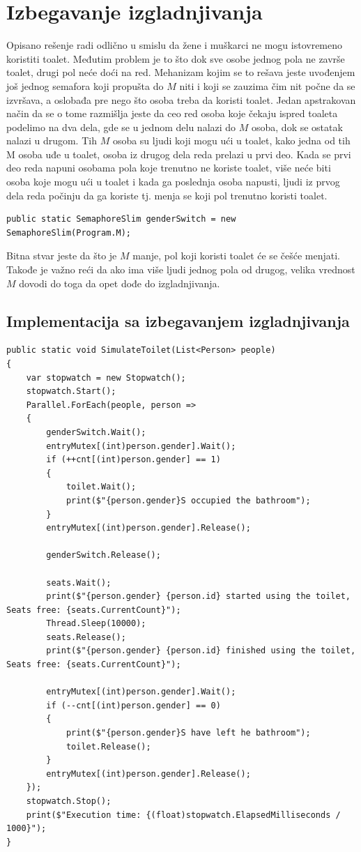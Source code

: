 \documentclass[11pt]{article}
\begin{document}
	\section{Izbegavanje izgladnjivanja}
	Opisano rešenje radi odlično u smislu da žene i muškarci ne mogu istovremeno
	koristiti toalet.
	Međutim problem je to što dok sve osobe jednog pola ne završe toalet,
	drugi pol neće doći na red.
	Mehanizam kojim se to rešava jeste uvođenjem još jednog semafora koji
	propušta do $M$ niti i koji se zauzima čim nit počne da se izvršava, a
	oslobađa pre nego što osoba treba da koristi toalet.
	Jedan apstrakovan način da se o tome razmišlja jeste da ceo red osoba
	koje čekaju ispred toaleta podelimo na dva dela, gde se u jednom delu
	nalazi do $M$ osoba, dok se ostatak nalazi u drugom.
	Tih $M$ osoba su ljudi koji mogu ući u toalet, kako jedna od tih M osoba
	uđe u toalet, osoba iz drugog dela reda prelazi u prvi deo.
	Kada se prvi deo reda napuni osobama pola koje trenutno ne koriste toalet,
	više neće biti osoba koje mogu ući u toalet i kada ga poslednja osoba
	napusti, ljudi iz prvog dela reda počinju da ga koriste tj. menja se koji
	pol trenutno koristi toalet.
	\vspace{0.5cm}
	\begin{lstlisting}[language={[Sharp]C}]
		public static SemaphoreSlim genderSwitch = new SemaphoreSlim(Program.M);
	\end{lstlisting}
	Bitna stvar jeste da što je $M$ manje, pol koji koristi toalet
	će se češće menjati.
	Takođe je važno reći da ako ima više ljudi jednog pola od drugog,
	velika vrednost $M$ dovodi do toga da opet dođe do izgladnjivanja.
	\subsection{Implementacija sa izbegavanjem izgladnjivanja}
	\begin{lstlisting}[language={[Sharp]C}]
public static void SimulateToilet(List<Person> people)
{
    var stopwatch = new Stopwatch();
    stopwatch.Start();
    Parallel.ForEach(people, person =>
    {
        genderSwitch.Wait();
        entryMutex[(int)person.gender].Wait();
        if (++cnt[(int)person.gender] == 1)
        {
            toilet.Wait();
            print($"{person.gender}S occupied the bathroom");
        }
        entryMutex[(int)person.gender].Release();

        genderSwitch.Release();

        seats.Wait();
        print($"{person.gender} {person.id} started using the toilet, Seats free: {seats.CurrentCount}");
        Thread.Sleep(10000);
        seats.Release();
        print($"{person.gender} {person.id} finished using the toilet, Seats free: {seats.CurrentCount}");

        entryMutex[(int)person.gender].Wait();
        if (--cnt[(int)person.gender] == 0)
        {
            print($"{person.gender}S have left he bathroom");
            toilet.Release();
        }
        entryMutex[(int)person.gender].Release();
    });
    stopwatch.Stop();
    print($"Execution time: {(float)stopwatch.ElapsedMilliseconds / 1000}");
}
	\end{lstlisting}
	\newpage
\end{document}
